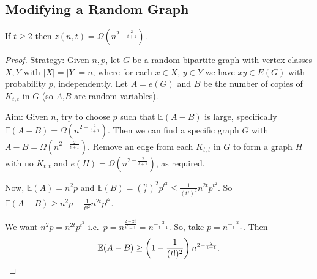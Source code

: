 \documentclass{article}
\begin{document}
\subsection{Modifying a Random Graph}













\begin{nthm}\label{thm:38}
    If $t \geq 2$ then $z(n,t) = \Omega(n^{2 - \frac{2}{t+1}})$.
\end{nthm}
\begin{proof}
    Strategy: Given $n,p$, let $G$ be a random bipartite graph with vertex classes $X,Y$ with $|X|=|Y|=n$, where for each $x \in X$, $y \in Y$ we have $xy \in E(G)$ with probability $p$, independently.
    Let $A = e(G)$ and $B$ be the number of copies of $K_{t,t}$ in $G$ (so $A$,$B$ are random variables).

    Aim: Given $n$, try to choose $p$ such that $\mathbb{E}(A-B)$ is large, specifically $\mathbb{E}(A-B) = \Omega(n^{2 - \frac{2}{t+1}})$.
    Then we can find a specific graph $G$ with $A-B = \Omega(n^{2-\frac{2}{t+1}})$.
    Remove an edge from each $K_{t,t}$ in $G$ to form a graph $H$ with no $K_{t,t}$ and $e(H) = \Omega(n^{2 - \frac{2}{t+1}})$, as required.

    Now, $\mathbb{E}(A) = n^2 p$ and $\mathbb{E}(B) = \binom{n}{t}^2 p^{t^2} \leq \frac{1}{(t!)^2} n^{2t}p^{t^2}$.
    So $\mathbb{E}(A-B) \geq n^2 p - \frac{1}{t!^2} n^{2t} p^{t^2}$.

    We want $n^2 p = n^{2t} p^{t^2}$ i.e.\ $p = n^{\frac{2-2t}{t^2-1}} = n^{-\frac{2}{t+1}}$.
    So, take $p = n^{-\frac{2}{t+1}}$.
    Then
    \begin{equation*}
        \mathbb{E}(A-B) \geq \left(1 - \frac{1}{(t!)^2}\right) n^{2 - \frac{2}{t+1}}. \qedhere
    \end{equation*}
\end{proof}
\end{document}
